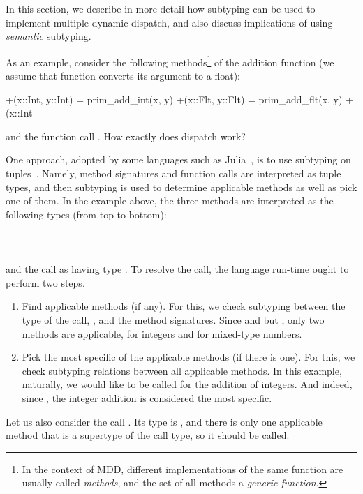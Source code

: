 In this section, we describe in more detail how subtyping
can be used to implement multiple dynamic dispatch,
and also discuss implications of using \emph{semantic} subtyping.

As an example, consider the following methods\footnote{In the context of MDD, 
	different implementations of 
	the same function are usually called \emph{methods},
	and the set of all methods a \emph{generic function}.}
of the addition function (we assume that function  
converts its argument to a float):
\begin{lstminijl}
+(x::Int, y::Int) = prim_add_int(x, y) 
+(x::Flt, y::Flt) = prim_add_flt(x, y) 
+(x::Int%
\end{lstminijl}
and the function call .
How exactly does dispatch work?

One approach, adopted by some languages
such as Julia~\cite{Bezanson2015AbstractionIT}, 
is to use subtyping on tuples~\cite{bib:Leavens:1998:mddtuples}.
Namely, method signatures and function calls are interpreted as tuple types,
and then subtyping is used to determine applicable methods 
as well as pick one of them.
In the example above, the three methods are interpreted 
as the following types (from top to bottom):\\
\\
\\
\\
and the call as having type .
To resolve the call, the language run-time ought to perform two steps.
\begin{enumerate}
  \item Find applicable methods (if any). For this, we check subtyping between
    the type of the call, , and the method signatures.
    Since  and  but
    , only two methods are applicable,
     for integers and  for mixed-type numbers.
  \item Pick the most specific of the applicable methods
    (if there is one).
    For this, we check subtyping relations between all applicable methods.
    In this example, naturally, we would like  to be called
    for the addition of integers. And indeed, since ,
    the integer addition is considered the most specific.
\end{enumerate}
Let us also consider the call . Its type is
, and there is only one applicable method 
that is a supertype of the call type, so it should be called.


